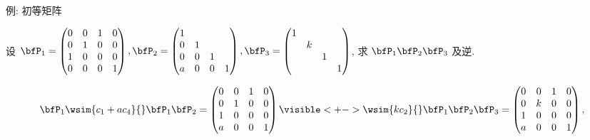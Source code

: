 \begin{frame}{例: 初等矩阵}\small
\beqskip{0pt}
	\onslide<+->
	\begin{example}
		设 $\bfP_1=\begin{pmatrix}
			0&0&1&0\\
			0&1&0&0\\
			1&0&0&0\\
			0&0&0&1
		\end{pmatrix},\bfP_2=\begin{pmatrix}
			1&&&\\
			0&1&&\\
			0&0&1&\\
			a&0&0&1
		\end{pmatrix},\bfP_3=\begin{pmatrix}
			1&&&\\
			&k&&\\
			&&1&\\
			&&&1
		\end{pmatrix}$, 求 $\bfP_1\bfP_2\bfP_3$ 及逆.
	\end{example}
	\onslide<+->
	\begin{solution}
		\[\bfP_1\wsim{c_1+ac_4}{}\bfP_1\bfP_2=\begin{pmatrix}
			0&0&1&0\\
			0&1&0&0\\
			1&0&0&0\\
			a&0&0&1
		\end{pmatrix}\visible<+->{\wsim{kc_2}{}
		\bfP_1\bfP_2\bfP_3=\begin{pmatrix}
			0&0&1&0\\
			0&k&0&0\\
			1&0&0&0\\
			a&0&0&1
		\end{pmatrix},}\]
		\onslide<+->{%
		\[\bfP_1^{-1}=\bfP_1\!\!\wsim{r_4-ar_1}{}\!\!
		(\bfP_1\bfP_2)^{-1}=\begin{pmatrix}
			0&0&1&0\\
			0&1&0&0\\
			1&0&0&0\\
			0&0&-a&1
		\end{pmatrix}\visible<+->{\!\!\wsim{\dfrac1k r_2}{}\!\!
		(\bfP_1\bfP_2\bfP_3)^{-1}=\begin{pmatrix}
			0&0&1&0\\
			0&1/k&0&0\\
			1&0&0&0\\
			0&0&-a&1
		\end{pmatrix}.}\]}
		\vspace{-.3\baselineskip}
	\end{solution}
\endgroup
\end{frame}


